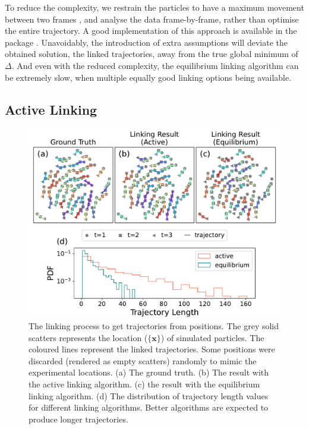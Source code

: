 \documentclass[11pt,twoside]{report}
\begin{document}
To reduce the complexity, we restrain the particles to have a maximum movement between two frames \cite{crocker1996}, and analyse the data frame-by-frame, rather than optimise the entire trajectory. A good implementation of this approach is available in the  package \cite{allan2021}. Unavoidably, the introduction of extra assumptions will deviate the obtained solution, the linked trajectories, away from the true global minimum of $\Delta$. And even with the reduced complexity, the equilibrium linking algorithm can be extremely slow, when multiple equally good linking options being available.

\subsection{Active Linking}
\label{section:link-act}

\begin{figure}
  \includegraphics[width=\linewidth]{linking-sim}
  \caption[Comparing two linking algorithms]{
  The linking process to get trajectories from positions. The grey solid scatters represents the location ($\{\mathbf{x}\}$) of simulated particles. The coloured lines represent the linked trajectories. Some positions were discarded (rendered as empty scatters) randomly to mimic the experimental locations.
  (a) The ground truth.
  (b) The result with the active linking algorithm.
  (c) the result with the equilibrium linking algorithm.
  (d) The distribution of trajectory length values for different linking algorithms. Better algorithms are expected to produce longer trajectories.
  }
  \label{fig:link-sim}
\end{figure}
\end{document}
